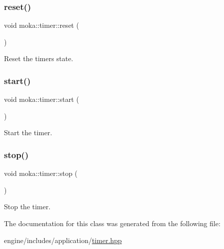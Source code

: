 \subsubsection{\texorpdfstring{reset()}{reset()}}
{\footnotesize\ttfamily void moka\+::timer\+::reset (\begin{DoxyParamCaption}{ }\end{DoxyParamCaption})}



Reset the timer\textquotesingle{}s state. 

\mbox{\label{classmoka_1_1timer_a7b1073657d0a16b347c4e7c0291b2ef9}} 
\subsubsection{\texorpdfstring{start()}{start()}}
{\footnotesize\ttfamily void moka\+::timer\+::start (\begin{DoxyParamCaption}{ }\end{DoxyParamCaption})}



Start the timer. 

\mbox{\label{classmoka_1_1timer_a1ef4c99828b76e137e7151688c94aa00}} 
\subsubsection{\texorpdfstring{stop()}{stop()}}
{\footnotesize\ttfamily void moka\+::timer\+::stop (\begin{DoxyParamCaption}{ }\end{DoxyParamCaption})}



Stop the timer. 



The documentation for this class was generated from the following file\+:\begin{DoxyCompactItemize}
\item 
engine/includes/application/\mbox{\hyperlink{timer_8hpp}{timer.\+hpp}}\end{DoxyCompactItemize}
